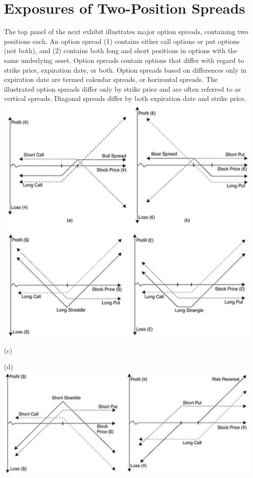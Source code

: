 \documentclass[11pt]{article}
\begin{document}
\section*{Exposures of Two-Position Spreads}
The top panel of the next exhibit illustrates major option spreads, containing two positions each. An option spread (1) contains either call options or put options (not both), and (2) contains both long and short positions in options with the same underlying asset. Option spreads contain options that differ with regard to strike price, expiration date, or both. Option spreads based on differences only in expiration date are termed calendar spreads, or horizontal spreads. The illustrated option spreads differ only by strike price and are often referred to as vertical spreads. Diagonal spreads differ by both expiration date and strike price.\\
\includegraphics[max width=\textwidth, center]{2024_04_11_d71a2c9aea882dc3a7b2g-4(1)}

(c)

(d)\\
\includegraphics[max width=\textwidth, center]{2024_04_11_d71a2c9aea882dc3a7b2g-4}
\end{document}
